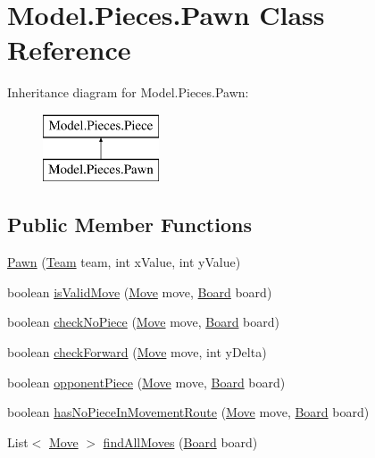 \hypertarget{class_model_1_1_pieces_1_1_pawn}{}\section{Model.\+Pieces.\+Pawn Class Reference}
\label{class_model_1_1_pieces_1_1_pawn}
Inheritance diagram for Model.\+Pieces.\+Pawn\+:\begin{figure}[H]
\begin{center}
\leavevmode
\includegraphics[height=2.000000cm]{class_model_1_1_pieces_1_1_pawn}
\end{center}
\end{figure}
\subsection*{Public Member Functions}
\begin{DoxyCompactItemize}
\item 
\hyperlink{class_model_1_1_pieces_1_1_pawn_ad3d3d740e79b02e16c5cc4b2da2f25bf}{Pawn} (\hyperlink{class_model_1_1_team}{Team} team, int x\+Value, int y\+Value)
\item 
boolean \hyperlink{class_model_1_1_pieces_1_1_pawn_a8bb2d90244e6992f8c24108d2a8c13e7}{is\+Valid\+Move} (\hyperlink{class_model_1_1_move}{Move} move, \hyperlink{class_model_1_1_board}{Board} board)
\item 
boolean \hyperlink{class_model_1_1_pieces_1_1_pawn_a92db7183e3d916aa6aed7c9a7cf89ba3}{check\+No\+Piece} (\hyperlink{class_model_1_1_move}{Move} move, \hyperlink{class_model_1_1_board}{Board} board)
\item 
boolean \hyperlink{class_model_1_1_pieces_1_1_pawn_a1088583c9809266ccefc49ce8d272d24}{check\+Forward} (\hyperlink{class_model_1_1_move}{Move} move, int y\+Delta)
\item 
boolean \hyperlink{class_model_1_1_pieces_1_1_pawn_a130ca7b5f609a5caf2e76e782efc30c4}{opponent\+Piece} (\hyperlink{class_model_1_1_move}{Move} move, \hyperlink{class_model_1_1_board}{Board} board)
\item 
boolean \hyperlink{class_model_1_1_pieces_1_1_pawn_a051caa0213913b8c3748f47a5bdfcab6}{has\+No\+Piece\+In\+Movement\+Route} (\hyperlink{class_model_1_1_move}{Move} move, \hyperlink{class_model_1_1_board}{Board} board)
\item 
List$<$ \hyperlink{class_model_1_1_move}{Move} $>$ \hyperlink{class_model_1_1_pieces_1_1_pawn_a95dcb404b5207a813149c152d3a48a50}{find\+All\+Moves} (\hyperlink{class_model_1_1_board}{Board} board)
\end{DoxyCompactItemize}


